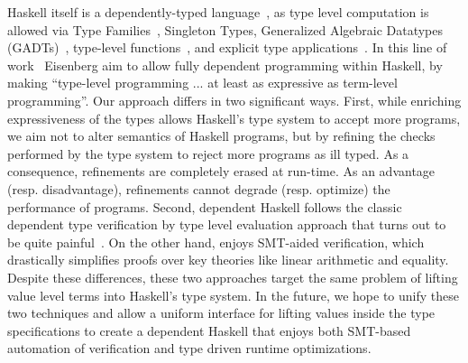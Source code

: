  
Haskell itself is a dependently-typed language~\cite{Eisenberg16},
as type level computation is allowed via 
Type Families~\cite{McBride02},
Singleton Types\cite{Weirich12}, 
Generalized Algebraic  Datatypes (GADTs)~\cite{JonesVWW06, SchrijversJSV09}, 
type-level functions~\cite{ChakravartyKJ05}, 
and explicit type applications~\cite{EisenbergWA16}. 
%
In this line of work~\citep{EisenbergS14}
Eisenberg \etal aim to allow fully dependent
programming within Haskell, by making
``type-level programming ... at least as
  expressive as term-level programming''.
%
Our approach differs in two significant ways.
%
First, while enriching expressiveness of the types
allows Haskell's type system to accept more programs, 
we aim not to alter semantics of Haskell programs, 
but by refining the checks performed by the type system 
to reject more programs as ill typed. 
%
As a consequence, refinements are completely erased at run-time.
%
As an advantage (resp. disadvantage), refinements
cannot degrade (resp. optimize)
the performance of programs.
%
Second, dependent Haskell follows the classic dependent type 
verification by type level evaluation approach
that turns out to be quite painful~\cite{LindleyM13}.
On the other hand, \toolname 
enjoys SMT-aided verification,
which drastically simplifies proofs over key theories
like linear arithmetic and equality.
%
Despite these differences, these two approaches target 
the same problem of lifting value level terms into Haskell's type system. 
%
In the future, we hope to unify these two techniques and 
allow a uniform interface for lifting values inside the type specifications
to create a dependent Haskell
that enjoys 
both SMT-based automation of verification and  
type driven runtime optimizations. 










